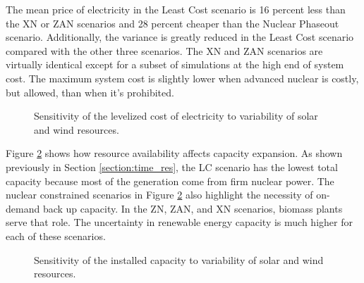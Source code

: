 The mean price of electricity in the Least Cost scenario is 16 percent less than
the XN or ZAN scenarios and 28 percent cheaper than the Nuclear Phaseout scenario.
Additionally, the variance is greatly reduced in the Least Cost scenario compared
with the other three scenarios. The XN and ZAN scenarios are virtually identical
except for a subset of simulations at the high end of system cost. The maximum
system cost is slightly lower when advanced nuclear is costly, but allowed,
than when it's prohibited.

\begin{figure}[H]
  \centering
  \resizebox{0.95\columnwidth}{!}{}
  \caption{Sensitivity of the levelized cost of electricity to variability of
   solar and wind resources.}
  \label{fig:obj_cost_plot}
\end{figure}

Figure \ref{fig:il_capacity} shows how resource availability affects capacity
expansion. As shown previously in Section \ref{section:time_res}, the LC scenario
has the lowest total capacity because most of the generation come from firm nuclear
power. The nuclear constrained scenarios in Figure \ref{fig:il_capacity} also
highlight the necessity of on-demand back up capacity. In the ZN, ZAN, and XN
scenarios, biomass plants serve that role. The uncertainty in renewable energy
capacity is much higher for each of these scenarios.


\begin{figure}[H]
  \centering
  \resizebox{0.95\columnwidth}{!}{}
  \caption{Sensitivity of the installed capacity to variability of
   solar and wind resources.}
  \label{fig:il_capacity}
\end{figure}
